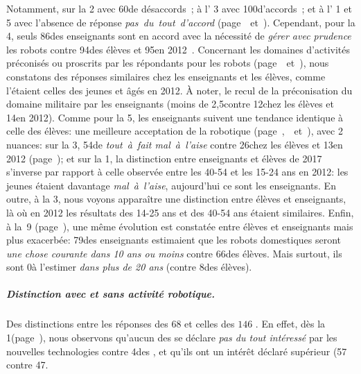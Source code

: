             Notamment, sur la 2\ieme {} avec 60\prc de désaccords~; à l' 3 avec 100\prc d'accords~; et à l'  1 et 5 avec l'absence de réponse \textit{pas~du~tout~d'accord} ({\footnotesize page~\pageref{QA5-1}~et~\pageref{QA5-5}}).
            Cependant, pour la 4\ieme {}, seuls 86\prc des enseignants sont en accord avec la nécessité de \textit{gérer avec prudence} les robots contre 94\prc des élèves et 95\prc en 2012~.
            Concernant les domaines d'activités préconisés ou proscrits par les répondants pour les robots  ({\footnotesize page~\pageref{QA6}~et~\pageref{QA7}}), nous constatons des réponses similaires chez les enseignants et les élèves, comme l'étaient celles des jeunes et âgés en 2012. À noter, le recul de la préconisation du domaine militaire par les enseignants (moins de 2,5\prc contre 12\prc chez les élèves et 14\prc en 2012).
            Comme pour la 5\ieme {}, les enseignants suivent une tendance identique à celle des élèves: une meilleure acceptation de la robotique ({\footnotesize page~\pageref{QA8-1},~\pageref{QA8-2}~et~\pageref{QA8-4}}), avec 2 nuances: sur la 3\ieme {}, 54\prc de \textit{tout~à~fait mal~à~l'aise} contre 26\prc chez les élèves et 13\prc en 2012 ({\footnotesize page~\pageref{QA8-3}}); et sur la 1\iere {}, la distinction entre enseignants et élèves de 2017 s'inverse par rapport à celle observée entre les 40-54 et les 15-24 ans en 2012: les jeunes étaient davantage \textit{mal~à~l'aise}, aujourd'hui ce sont les enseignants.
            En outre, à la 3\ieme {}, nous voyons apparaître une distinction entre élèves et enseignants, là où en 2012 les résultats des 14-25 ans et des 40-54 ans étaient similaires.
            Enfin, à la~9 ({\footnotesize page~\pageref{QA9}}), une même évolution est constatée entre élèves et enseignants mais plus exacerbée: 79\prc des enseignants estimaient que les robots domestiques seront \textit{une chose courante dans 10 ans ou moins} contre 66\prc des élèves. Mais surtout, ils sont 0\prc à l'estimer \textit{dans plus de 20 ans} (contre 8\prc des élèves).
          \subparagraph{Distinction avec et sans activité robotique.}
            Des distinctions entre les réponses des $68$  et celles des $146$ .
            En effet, dès la 1\iere {}({\footnotesize page~\pageref{QA1}}), nous observons qu'aucun des  se déclare \textit{pas du tout intéressé} par les nouvelles technologies contre 4\prc des , et qu'ils ont un intérêt déclaré supérieur (57 contre 47\prc[)]. 
